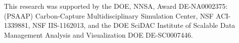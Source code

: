 This research was supported by the DOE, NNSA, Award DE-NA0002375: (PSAAP) Carbon-Capture Multidisciplinary Simulation Center, NSF ACI-1339881, NSF IIS-1162013, and the DOE SciDAC Institute of Scalable Data Management Analysis and Visualization DOE DE-SC0007446.